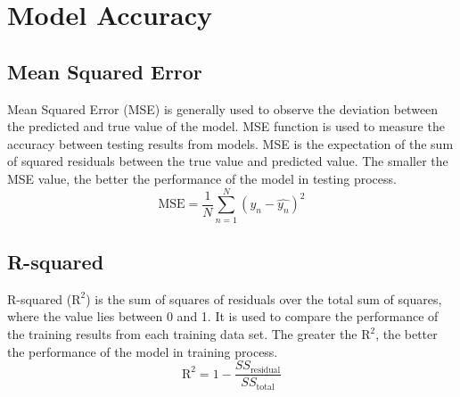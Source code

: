 \section{Model Accuracy} %

\subsection{Mean Squared Error}
Mean Squared Error (MSE) is generally used to observe the deviation between the predicted and true value of the model. MSE function is used to measure the accuracy between testing results from models. MSE is the expectation of the sum of squared residuals between the true value and predicted value. The smaller the MSE value, the better the performance of the model in testing process.
$${\text{MSE} ={\frac {1}{N}}\sum _{n=1}^{N}(y_{n}-{\hat {y_{n}}})^{2}}$$


\subsection{R-squared}
R-squared ($\text{R}^{2}$) is the sum of squares of residuals over the total sum of squares, where the value lies between 0 and 1. It is used to compare the performance of the training results from each training data set. The greater the $\text{R}^{2}$, the better the performance of the model in training process.
$$ \text{R}^{2} = {1}-{\frac {SS_{\text{residual}}}{SS_{\text{total}}}}$$


